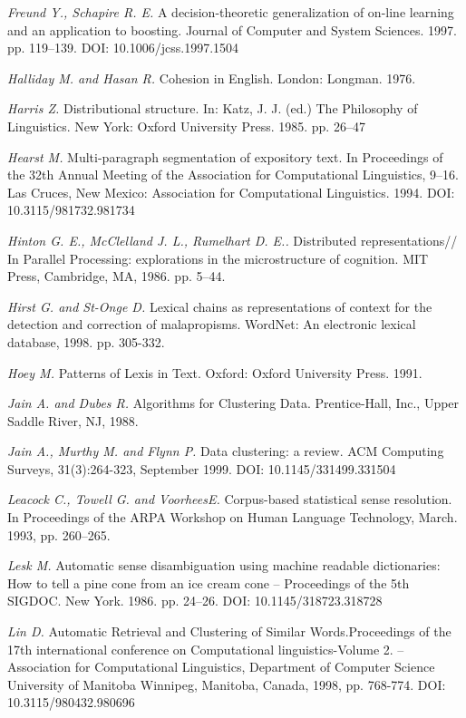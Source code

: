 \documentclass{article}
\begin{document}
\begin{articletext}
\begin{thebibliography}{9}
\textit{Freund Y.,  Schapire R. E. }A decision-theoretic generalization of on-line learning and an application to boosting. Journal of Computer and System Sciences. 1997. pp. 119–139. DOI: 10.1006/jcss.1997.1504

\textit{Halliday M. and  Hasan R. }Cohesion in English. London: Longman. 1976. 

\textit{Harris Z. }Distributional structure. In: Katz, J. J. (ed.) The Philosophy of Linguistics. New York: Oxford University Press. 1985. pp. 26–47

\textit{Hearst M. }Multi-paragraph segmentation of expository text. In Proceedings of the 32th Annual Meeting of the Association for Computational Linguistics, 9–16. Las Cruces, New Mexico: Association for Computational Linguistics. 1994. DOI: 10.3115/981732.981734

\textit{Hinton G. E.,  McClelland J. L.,  Rumelhart D. E.. }Distributed representations// In Parallel Processing: explorations in the microstructure of cognition. MIT Press, Cambridge, MA, 1986. pp. 5–44.

\textit{Hirst G. and  St-Onge D. }Lexical chains as representations of context for the detection and correction of malapropisms. WordNet: An electronic lexical database, 1998. pp. 305-332.

\textit{Hoey M. }Patterns of Lexis in Text. Oxford: Oxford University Press. 1991. 

\textit{Jain A. and  Dubes R. }Algorithms for Clustering Data. Prentice-Hall, Inc., Upper Saddle River, NJ, 1988.

\textit{Jain A.,  Murthy M. and  Flynn P. }Data clustering: a review. ACM Computing Surveys, 31(3):264-323, September 1999. DOI: 10.1145/331499.331504

\textit{Leacock C.,  Towell G. and  VoorheesE. }Corpus-based statistical sense resolution. In Proceedings of the ARPA Workshop on Human Language Technology, March. 1993, pp. 260–265.  

\textit{Lesk M. }Automatic sense disambiguation using machine readable dictionaries: How to tell a pine cone from an ice cream cone --  Proceedings  of  the 5th SIGDOC. New York. 1986. pp. 24–26. DOI: 10.1145/318723.318728

\textit{Lin D. }Automatic Retrieval and Clustering of Similar Words.Proceedings of the 17th international conference on Computational linguistics-Volume 2. – Association for Computational Linguistics, Department of Computer Science University of Manitoba Winnipeg, Manitoba, Canada, 1998, pp. 768-774. DOI: 10.3115/980432.980696


\end{thebibliography}
\end{articletext}
\end{document}

